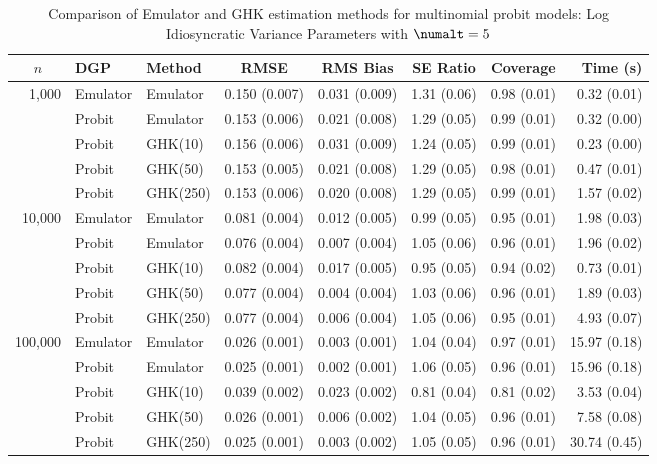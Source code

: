 \begin{table}[htbp]
\centering
\footnotesize
\begin{tabular}{@{}rllrrrrr@{}}
\toprule
\multicolumn{1}{c}{$n$} & \multicolumn{1}{l}{DGP} & \multicolumn{1}{l}{Method} & \multicolumn{1}{c}{RMSE} & \multicolumn{1}{c}{RMS Bias} & \multicolumn{1}{c}{SE Ratio} & \multicolumn{1}{c}{Coverage} & \multicolumn{1}{r}{Time (s)} \\
\midrule
\multirow{5}{*}{1,000} & Emulator & Emulator & 0.150 (0.007) & 0.031 (0.009) & 1.31 (0.06) & 0.98 (0.01) & 0.32 (0.01) \\
 & Probit & Emulator & 0.153 (0.006) & 0.021 (0.008) & 1.29 (0.05) & 0.99 (0.01) & 0.32 (0.00) \\
 & Probit & GHK(10) & 0.156 (0.006) & 0.031 (0.009) & 1.24 (0.05) & 0.99 (0.01) & 0.23 (0.00) \\
 & Probit & GHK(50) & 0.153 (0.005) & 0.021 (0.008) & 1.29 (0.05) & 0.98 (0.01) & 0.47 (0.01) \\
 & Probit & GHK(250) & 0.153 (0.006) & 0.020 (0.008) & 1.29 (0.05) & 0.99 (0.01) & 1.57 (0.02) \\
\midrule
\multirow{5}{*}{10,000} & Emulator & Emulator & 0.081 (0.004) & 0.012 (0.005) & 0.99 (0.05) & 0.95 (0.01) & 1.98 (0.03) \\
 & Probit & Emulator & 0.076 (0.004) & 0.007 (0.004) & 1.05 (0.06) & 0.96 (0.01) & 1.96 (0.02) \\
 & Probit & GHK(10) & 0.082 (0.004) & 0.017 (0.005) & 0.95 (0.05) & 0.94 (0.02) & 0.73 (0.01) \\
 & Probit & GHK(50) & 0.077 (0.004) & 0.004 (0.004) & 1.03 (0.06) & 0.96 (0.01) & 1.89 (0.03) \\
 & Probit & GHK(250) & 0.077 (0.004) & 0.006 (0.004) & 1.05 (0.06) & 0.95 (0.01) & 4.93 (0.07) \\
\midrule
\multirow{5}{*}{100,000} & Emulator & Emulator & 0.026 (0.001) & 0.003 (0.001) & 1.04 (0.04) & 0.97 (0.01) & 15.97 (0.18) \\
 & Probit & Emulator & 0.025 (0.001) & 0.002 (0.001) & 1.06 (0.05) & 0.96 (0.01) & 15.96 (0.18) \\
 & Probit & GHK(10) & 0.039 (0.002) & 0.023 (0.002) & 0.81 (0.04) & 0.81 (0.02) & 3.53 (0.04) \\
 & Probit & GHK(50) & 0.026 (0.001) & 0.006 (0.002) & 1.04 (0.05) & 0.96 (0.01) & 7.58 (0.08) \\
 & Probit & GHK(250) & 0.025 (0.001) & 0.003 (0.002) & 1.05 (0.05) & 0.96 (0.01) & 30.74 (0.45) \\
\bottomrule
\end{tabular}
\caption{Comparison of Emulator and GHK estimation methods for multinomial probit models: Log Idiosyncratic Variance Parameters with $\numalt=5$}
\label{tab:emulator_vs_ghk:5:logpsi}
\end{table}